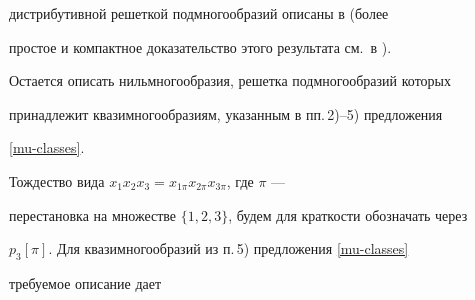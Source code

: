 дистрибутивной решеткой подмногообразий описаны в \cite{Vol92d} (более


простое и компактное доказательство этого результата см.\ в \cite{VV00a}).


Остается описать нильмногообразия, решетка подмногообразий которых


принадлежит квазимногообразиям, указанным в пп.\,2)--5) предложения


\ref{mu-classes}.





Тождество вида $x_1x_2x_3=x_{1\pi}x_{2\pi}x_{3\pi}$, где $\pi$ ---


перестановка на множестве $\{1,2,3\}$, будем для краткости обозначать через


$p_3[\pi]$. Для квазимногообразий из п.\,5) предложения \ref{mu-classes}


требуемое описание дает





